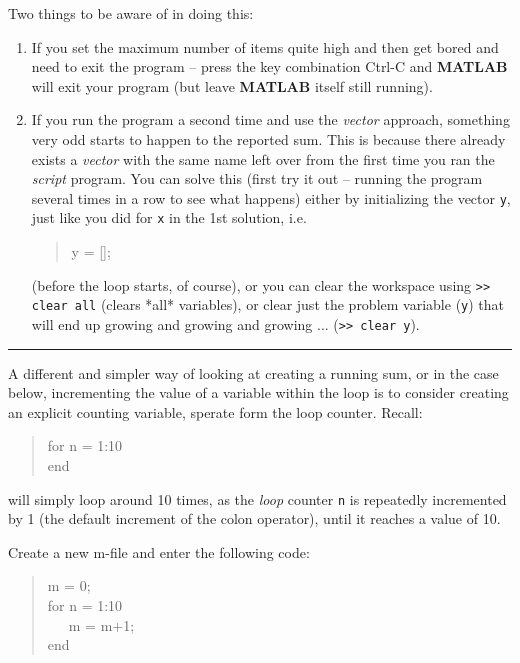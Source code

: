 \documentclass{tufte-book} %
\newenvironment{docspec}{\begin{quotation}\ttfamily\parskip0pt\parindent0pt\ignorespaces}{\end{quotation}}
\begin{document}
Two things to be aware of in doing this:

\begin{enumerate}[noitemsep]
\setlength{\itemindent}{.2in}
\vspace{1mm}
\item If you set the maximum number of items quite high and then get bored and need to exit the program -- press the key combination \textsf{Ctrl-C} and \textbf{MATLAB} will exit your program (but leave \textbf{MATLAB} itself still running).
\vspace{1mm}
\item If you run the program a second time and use the \textit{vector} approach, something very odd starts to happen to the reported sum. This is because there already exists a \textit{vector} with the same name left over from the first time you ran the \textit{script} program. You can solve this (first try it out -- running the program several times in a row to see what happens) either by initializing the vector \texttt{y}, just like you did for \texttt{x} in the 1st solution, i.e.
\begin{docspec}
y = [];
\end{docspec}
(before the loop starts, of course), or you can clear the workspace using \texttt{>> clear all} (clears *all* variables), or clear just the problem variable (\texttt{y}) that will end up growing and growing and growing ... (\texttt{>> clear y}).  
\end{enumerate}

\vspace{-1mm}
\noindent\rule{4cm}{0.5pt}
\vspace{2mm}

A different and simpler way of looking at creating a running sum, or in the case below, incrementing the value of a variable within the loop is to consider creating an explicit counting variable, sperate form the loop counter. Recall:

\begin{docspec}
for n = 1:10\\
end
\end{docspec}

\noindent will simply loop around 10 times, as the \textit{loop} counter \texttt{n} is repeatedly incremented by 1 (the default increment of the colon operator), until it reaches a value of 10.

Create a new \textsf{m-file} and enter the following code:

\begin{docspec}
m = 0;\\
for n = 1:10\\
\ \ \ m = m+1;\\
end
\end{docspec}
\end{document}
